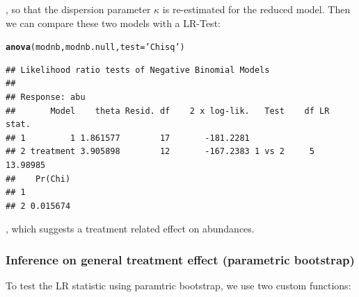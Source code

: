 \documentclass{scrartcl}\usepackage[]{graphicx}\usepackage[]{color}
\makeatletter
\newcommand{\hlstr}[1]{\textcolor[rgb]{0.192,0.494,0.8}{#1}}%
\newcommand{\hlstd}[1]{\textcolor[rgb]{0.345,0.345,0.345}{#1}}%
\newcommand{\hlkwc}[1]{\textcolor[rgb]{0.333,0.667,0.333}{#1}}%
\newcommand{\hlkwd}[1]{\textcolor[rgb]{0.737,0.353,0.396}{\textbf{#1}}}%
\newenvironment{kframe}{%
 \def\at@end@of@kframe{}%
 \ifinner\ifhmode%
  \def\at@end@of@kframe{\end{minipage}}%
  \begin{minipage}{\columnwidth}%
 \fi\fi%
 \def\FrameCommand##1{\hskip\@totalleftmargin \hskip-\fboxsep
 \colorbox{shadecolor}{##1}\hskip-\fboxsep
     \hskip-\linewidth \hskip-\@totalleftmargin \hskip\columnwidth}%
 \MakeFramed {\advance\hsize-\width
   \@totalleftmargin\z@ \linewidth\hsize
   \@setminipage}}%
 {\par\unskip\endMakeFramed%
 \at@end@of@kframe}
\newenvironment{knitrout}{}{} %
\renewenvironment{knitrout}{\begin{spacing}{1}}{\end{spacing}}
\makeatother
\begin{document}
, so that the dispersion parameter $\kappa$ is re-estimated for the reduced model.
Then we can compare these two models with a LR-Test:
\begin{knitrout}
\color{fgcolor}\begin{kframe}
\begin{alltt}
\hlkwd{anova}\hlstd{(modnb, modnb.null,} \hlkwc{test} \hlstd{=} \hlstr{'Chisq'}\hlstd{)}
\end{alltt}
\begin{verbatim}
## Likelihood ratio tests of Negative Binomial Models
## 
## Response: abu
##       Model    theta Resid. df    2 x log-lik.   Test    df LR stat.
## 1         1 1.861577        17       -181.2281                      
## 2 treatment 3.905898        12       -167.2383 1 vs 2     5 13.98985
##    Pr(Chi)
## 1         
## 2 0.015674
\end{verbatim}
\end{kframe}
\end{knitrout}
, which suggests a treatment related effect on abundances.


\subsubsection{Inference on general treatment effect (parametric bootstrap)}

To test the LR statistic using paramtric bootstrap, we use two custom functions:
\end{document}
